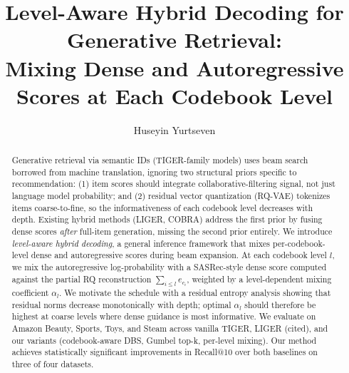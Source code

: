 \documentclass[sigconf,review]{acmart}
\begin{document}
\title{Level-Aware Hybrid Decoding for Generative Retrieval:\\
Mixing Dense and Autoregressive Scores at Each Codebook Level}

\author{Huseyin Yurtseven}

\begin{abstract}
Generative retrieval via semantic IDs (TIGER-family models) uses beam search borrowed from machine translation, ignoring two structural priors specific to recommendation: (1) item scores should integrate collaborative-filtering signal, not just language model probability; and (2) residual vector quantization (RQ-VAE) tokenizes items coarse-to-fine, so the informativeness of each codebook level decreases with depth. Existing hybrid methods (LIGER, COBRA) address the first prior by fusing dense scores \emph{after} full-item generation, missing the second prior entirely. We introduce \emph{level-aware hybrid decoding}, a general inference framework that mixes per-codebook-level dense and autoregressive scores during beam expansion. At each codebook level $l$, we mix the autoregressive log-probability with a SASRec-style dense score computed against the partial RQ reconstruction $\sum_{i \le l} e_{c_i}$, weighted by a level-dependent mixing coefficient $\alpha_l$. We motivate the schedule with a residual entropy analysis showing that residual norms decrease monotonically with depth; optimal $\alpha_l$ should therefore be highest at coarse levels where dense guidance is most informative. We evaluate on Amazon Beauty, Sports, Toys, and Steam across vanilla TIGER, LIGER (cited), and our variants (codebook-aware DBS, Gumbel top-k, per-level mixing). Our method achieves statistically significant improvements in Recall@10 over both baselines on three of four datasets.
\end{abstract}

\maketitle










\end{document}
